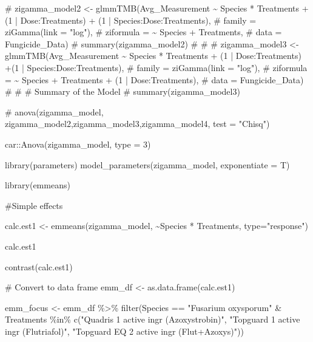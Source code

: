 \documentclass[
  10pt,
  letterpaper,
  twocolumn]{article}
\newenvironment{Shaded}{\begin{snugshade}}{\end{snugshade}}
\newcommand{\AttributeTok}[1]{\textcolor[rgb]{0.40,0.45,0.13}{#1}}
\newcommand{\CommentTok}[1]{\textcolor[rgb]{0.37,0.37,0.37}{#1}}
\newcommand{\DecValTok}[1]{\textcolor[rgb]{0.68,0.00,0.00}{#1}}
\newcommand{\FunctionTok}[1]{\textcolor[rgb]{0.28,0.35,0.67}{#1}}
\newcommand{\NormalTok}[1]{\textcolor[rgb]{0.00,0.23,0.31}{#1}}
\newcommand{\OtherTok}[1]{\textcolor[rgb]{0.00,0.23,0.31}{#1}}
\newcommand{\SpecialCharTok}[1]{\textcolor[rgb]{0.37,0.37,0.37}{#1}}
\newcommand{\StringTok}[1]{\textcolor[rgb]{0.13,0.47,0.30}{#1}}
\begin{document}
\begin{Shaded}
\begin{Highlighting}[]
\CommentTok{\# zigamma\_model2 \textless{}{-} glmmTMB(Avg\_Measurement \textasciitilde{} Species * Treatments + (1 | Dose:Treatments) + (1 | Species:Dose:Treatments),}
\CommentTok{\#                           family = ziGamma(link = "log"), }
\CommentTok{\#                           ziformula = \textasciitilde{} Species + Treatments, }
\CommentTok{\#                           data = Fungicide\_Data)}
\CommentTok{\# summary(zigamma\_model2)}
\CommentTok{\# }
\CommentTok{\# }
\CommentTok{\# zigamma\_model3 \textless{}{-} glmmTMB(Avg\_Measurement \textasciitilde{} Species * Treatments + (1 | Dose:Treatments) +(1 | Species:Dose:Treatments),  }
\CommentTok{\#                          family = ziGamma(link = "log"), }
\CommentTok{\#                          ziformula = \textasciitilde{} Species + Treatments + (1 | Dose:Treatments), }
\CommentTok{\#                          data = Fungicide\_Data)}
\CommentTok{\# }
\CommentTok{\# \# Summary of the Model}
\CommentTok{\# summary(zigamma\_model3)}

\CommentTok{\# anova(zigamma\_model, zigamma\_model2,zigamma\_model3,zigamma\_model4, test = "Chisq")}

\NormalTok{car}\SpecialCharTok{::}\FunctionTok{Anova}\NormalTok{(zigamma\_model, }\AttributeTok{type =} \DecValTok{3}\NormalTok{)}

\FunctionTok{library}\NormalTok{(parameters)}
\FunctionTok{model\_parameters}\NormalTok{(zigamma\_model, }\AttributeTok{exponentiate =}\NormalTok{ T)}


\FunctionTok{library}\NormalTok{(emmeans)}

\CommentTok{\#Simple effects}

\NormalTok{calc.est1 }\OtherTok{\textless{}{-}} \FunctionTok{emmeans}\NormalTok{(zigamma\_model, }\SpecialCharTok{\textasciitilde{}}\NormalTok{Species }\SpecialCharTok{*}\NormalTok{ Treatments, }\AttributeTok{type=}\StringTok{"response"}\NormalTok{)}

\NormalTok{calc.est1}

\FunctionTok{contrast}\NormalTok{(calc.est1)}


\CommentTok{\# Convert to data frame}
\NormalTok{emm\_df }\OtherTok{\textless{}{-}} \FunctionTok{as.data.frame}\NormalTok{(calc.est1)}

\NormalTok{emm\_focus }\OtherTok{\textless{}{-}}\NormalTok{ emm\_df }\SpecialCharTok{\%\textgreater{}\%}
  \FunctionTok{filter}\NormalTok{(Species }\SpecialCharTok{==} \StringTok{"Fusarium oxysporum"} \SpecialCharTok{\&} 
\NormalTok{           Treatments }\SpecialCharTok{\%in\%} \FunctionTok{c}\NormalTok{(}\StringTok{"Quadris 1 active ingr (Azoxystrobin)"}\NormalTok{, }\StringTok{"Topguard 1 active ingr (Flutriafol)"}\NormalTok{, }\StringTok{"Topguard EQ 2 active ingr (Flut+Azoxys)"}\NormalTok{))}


\end{Highlighting}
\end{Shaded}
\end{document}
